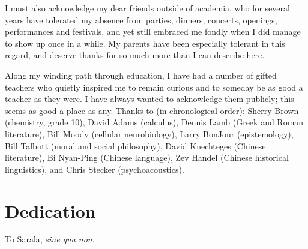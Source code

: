 \begin{spacing}{2}
I must also acknowledge my dear friends outside of academia, who for several years have tolerated my absence from parties, dinners, concerts, openings, performances and festivals, and yet still embraced me fondly when I did manage to show up once in a while.  My parents have been especially tolerant in this regard, and deserve thanks for so much more than I can describe here.

Along my winding path through education, I have had a number of gifted teachers who quietly inspired me to remain curious and to someday be as good a teacher as they were.  I have always wanted to acknowledge them publicly; this seems as good a place as any.  Thanks to (in chronological order): Sherry Brown (chemistry, grade 10), David Adams (calculus), Dennis Lamb (Greek and Roman literature), Bill Moody (cellular neurobiology), Larry BonJour (epistemology), Bill Talbott (moral and social philosophy), David Knechteges (Chinese literature), Bi Nyan-Ping (Chinese language), Zev Handel (Chinese historical linguistics), and Chris Stecker (psychoacoustics).
\newpage

\chapter*{Dedication}
To Sarala, \textit{sine qua non}.
\end{spacing}
